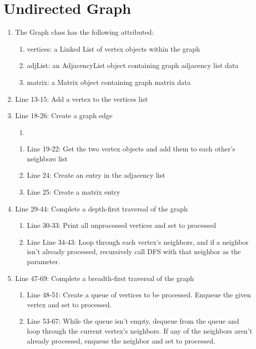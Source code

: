 \documentclass[letterpaper, 10pt,DIV=13]{scrartcl}
\numberwithin{equation}{section} %
\numberwithin{figure}{section} %
\numberwithin{table}{section} %
\begin{document}
\section{Undirected Graph}
\begin{enumerate}
    \item The Graph class has the following attributed:
    \begin{enumerate}
        \item vertices: a Linked List of vertex objects within the graph
        \item adjList: an AdjacencyList object containing graph adjacency list data
        \item matrix: a Matrix object containing graph matrix data
    \end{enumerate}
    \item Line 13-15: Add a vertex to the vertices list
    \item Line 18-26: Create a graph edge
    \begin{enumerate}
        \item 
    \end{enumerate}
        \begin{enumerate}
            \item Line 19-22: Get the two vertex objects and add them to each other's neighbors list
            \item Line 24: Create an entry in the adjacency list
            \item Line 25: Create a matrix entry
        \end{enumerate}
        \item Line 29-44: Complete a depth-first traversal of the graph
        \begin{enumerate}
            \item Line 30-33: Print all unprocessed vertices and set to processed
            \item Line Line 34-43: Loop through each vertex's neighbors, and if a neighbor isn't already processed, recursively call DFS with that neighbor as the parameter.
        \end{enumerate}
        \item Line 47-69: Complete a breadth-first traversal of the graph
        \begin{enumerate}
            \item Line 48-51: Create a queue of vertices to be processed. Enqueue the given vertex and set to processed.
            \item Line 53-67: While the queue isn't empty, dequeue from the queue and loop through the current vertex's neighbors. If any of the neighbors aren't already processed, enqueue the neighbor and set to processed.

\end{enumerate}
\end{enumerate}
\end{document}
